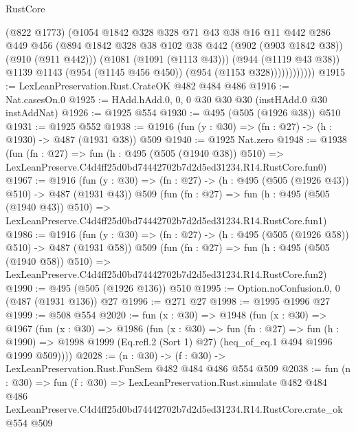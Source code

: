\begin{lexlean}{RustCore}
\begin{coremodule}
                      (@822 @1773)
                      (@1054
                        @1842
                        @328
                        @328
                        @71
                        @43
                        @38
                        @16
                        @11
                        @442
                        @286
                        @449
                        @456
                        (@894
                          @1842
                          @328
                          @38
                          @102
                          @38
                          @442
                          (@902 (@903 @1842 @38))
                          (@910 (@911 @442)))
                        (@1081 (@1091 (@1113 @43)))
                        (@944 (@1119 @43 @38))
                        @1139
                        @1143
                        (@954 (@1145 @456 @450))
                        (@954 (@1153 @328))))))))))))
@1915 := LexLeanPreservation.Rust.CrateOK @482 @484 @486
@1916 := Nat.casesOn.{0}
@1925 := HAdd.hAdd.{0, 0, 0} @30 @30 @30 (instHAdd.{0} @30 instAddNat)
@1926 := @1925 @554
@1930 := @495 (@505 (@1926 @38)) @510
@1931 := @1925 @552
@1938 := @1916 (fun (y : @30) => (fn : @27) -> (h : @1930) -> @487 (@1931 @38)) @509
@1940 := @1925 Nat.zero
@1948 := @1938
    (fun (fn : @27) =>
    fun (h : @495 (@505 (@1940 @38)) @510) =>
    LexLeanPreserve.C4d4ff25d0bd74442702b7d2d5ed31234.R14.RustCore.fun0)
@1967 := @1916
    (fun (y : @30) => (fn : @27) -> (h : @495 (@505 (@1926 @43)) @510) -> @487 (@1931 @43))
    @509
    (fun (fn : @27) =>
    fun (h : @495 (@505 (@1940 @43)) @510) =>
    LexLeanPreserve.C4d4ff25d0bd74442702b7d2d5ed31234.R14.RustCore.fun1)
@1986 := @1916
    (fun (y : @30) => (fn : @27) -> (h : @495 (@505 (@1926 @58)) @510) -> @487 (@1931 @58))
    @509
    (fun (fn : @27) =>
    fun (h : @495 (@505 (@1940 @58)) @510) =>
    LexLeanPreserve.C4d4ff25d0bd74442702b7d2d5ed31234.R14.RustCore.fun2)
@1990 := @495 (@505 (@1926 @136)) @510
@1995 := Option.noConfusion.{0, 0} (@487 (@1931 @136)) @27
@1996 := @271 @27
@1998 := @1995 @1996 @27
@1999 := @508 @554
@2020 := fun (x : @30) =>
  @1948
    (fun (x : @30) =>
    @1967
      (fun (x : @30) =>
      @1986
        (fun (x : @30) =>
        fun (fn : @27) =>
        fun (h : @1990) =>
        @1998 @1999 (Eq.refl.{2} (Sort 1) @27) (heq_of_eq.{1} @494 @1996 @1999 @509))))
@2028 := (n : @30) -> (f : @30) -> LexLeanPreservation.Rust.FunSem @482 @484 @486 @554 @509
@2038 := fun (n : @30) =>
  fun (f : @30) =>
  LexLeanPreservation.Rust.simulate
    @482
    @484
    @486
    LexLeanPreserve.C4d4ff25d0bd74442702b7d2d5ed31234.R14.RustCore.crate_ok
    @554
    @509
\end{coremodule}
\end{lexlean}
